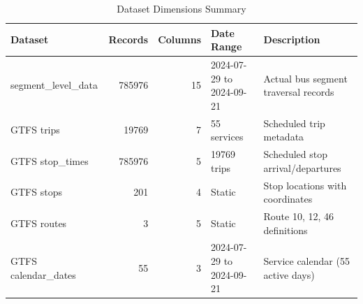 \begin{table}
\caption{Dataset Dimensions Summary}
\label{tab:data_dimensions}
\begin{tabular}{lrrll}
\toprule
Dataset & Records & Columns & Date Range & Description \\
\midrule
segment_level_data & 785976 & 15 & 2024-07-29 to 2024-09-21 & Actual bus segment traversal records \\
GTFS trips & 19769 & 7 & 55 services & Scheduled trip metadata \\
GTFS stop_times & 785976 & 5 & 19769 trips & Scheduled stop arrival/departures \\
GTFS stops & 201 & 4 & Static & Stop locations with coordinates \\
GTFS routes & 3 & 5 & Static & Route 10, 12, 46 definitions \\
GTFS calendar_dates & 55 & 3 & 2024-07-29 to 2024-09-21 & Service calendar (55 active days) \\
\bottomrule
\end{tabular}
\end{table}
